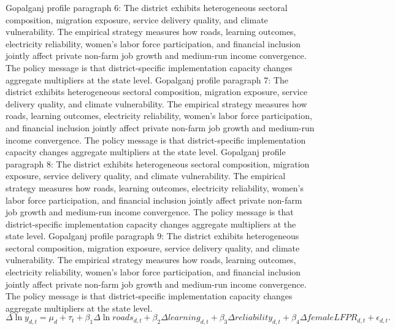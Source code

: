 \documentclass[preprint,12pt]{elsarticle}
\begin{document}
Gopalganj profile paragraph 6: The district exhibits heterogeneous sectoral composition, migration exposure, service delivery quality, and climate vulnerability. The empirical strategy measures how roads, learning outcomes, electricity reliability, women's labor force participation, and financial inclusion jointly affect private non-farm job growth and medium-run income convergence. The policy message is that district-specific implementation capacity changes aggregate multipliers at the state level.
Gopalganj profile paragraph 7: The district exhibits heterogeneous sectoral composition, migration exposure, service delivery quality, and climate vulnerability. The empirical strategy measures how roads, learning outcomes, electricity reliability, women's labor force participation, and financial inclusion jointly affect private non-farm job growth and medium-run income convergence. The policy message is that district-specific implementation capacity changes aggregate multipliers at the state level.
Gopalganj profile paragraph 8: The district exhibits heterogeneous sectoral composition, migration exposure, service delivery quality, and climate vulnerability. The empirical strategy measures how roads, learning outcomes, electricity reliability, women's labor force participation, and financial inclusion jointly affect private non-farm job growth and medium-run income convergence. The policy message is that district-specific implementation capacity changes aggregate multipliers at the state level.
Gopalganj profile paragraph 9: The district exhibits heterogeneous sectoral composition, migration exposure, service delivery quality, and climate vulnerability. The empirical strategy measures how roads, learning outcomes, electricity reliability, women's labor force participation, and financial inclusion jointly affect private non-farm job growth and medium-run income convergence. The policy message is that district-specific implementation capacity changes aggregate multipliers at the state level.
\begin{equation}\Delta \ln y_{d,t}=\mu_d+\tau_t+\beta_1\Delta\ln roads_{d,t}+\beta_2\Delta learning_{d,t}+\beta_3\Delta reliability_{d,t}+\beta_4\Delta femaleLFPR_{d,t}+\epsilon_{d,t}.\end{equation}
\end{document}
